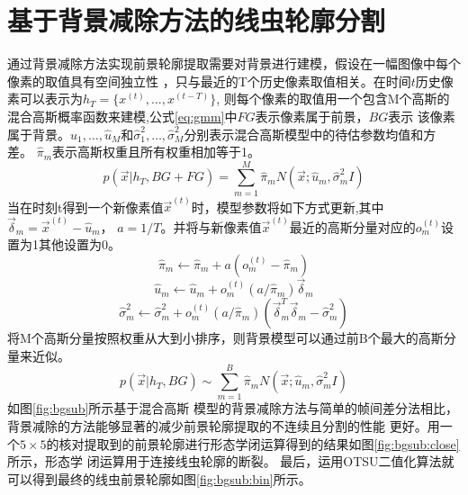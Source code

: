 \section{基于背景减除方法的线虫轮廓分割}
	通过背景减除方法实现前景轮廓提取需要对背景进行建模，假设在一幅图像中每个像素的取值具有空间独立性
	，只与最近的T个历史像素取值相关。在时间$t$历史像素可以表示为$h_T=\{x^{(t)},\dots,x^{(t-T)}\}$,
	则每个像素的取值用一个包含M个高斯的混合高斯概率函数来建模,公式\ref{eq:gmm}中$FG$表示像素属于前景，$BG$表示
	该像素属于背景。$\hat{u}_1,\dots,\hat{u}_M$和$\hat{\sigma}_1^2,\dots,\hat{\sigma}_M^2$分别表示混合高斯模型中的待估参数均值和方差。
	$\hat{\pi}_m$表示高斯权重且所有权重相加等于1。
	\begin{equation}
		p(\vec{x}|h_T,BG+FG)= \sum_{m=1}^{M} \hat{\pi}_{m}N(\vec{x};\hat{u}_m,\hat{\sigma}_m^2I)\label{eq:gmm}
	\end{equation}
	当在时刻t得到一个新像素值$\vec{x}^{(t)}$时，模型参数将如下方式更新,其中$\vec{\delta}_m=\vec{x}^{(t)}-\hat{u}_m$，
	$a=1/T$。并将与新像素值$\vec{x}^{(t)}$最近的高斯分量对应的$o_m^{(t)}$设置为1其他设置为0。
	\begin{equation}
		\hat{\pi}_m \leftarrow \hat{\pi}_m +a(o_m^{(t)}-\hat{\pi}_m) \label{eq:updata}
	\end{equation}
	\begin{equation}
		\hat{u}_m \leftarrow \hat{u}_m +o_m^{(t)}(a/\hat{\pi}_m)\vec{\delta}_m \label{eq:updata1}
	\end{equation}
	\begin{equation}
		\hat{\sigma}_m^2 \leftarrow \hat{\sigma}_m^2 +o_m^{(t)}(a/\hat{\pi}_m)(\vec{\delta}_m^T\vec{\delta}_m-\hat{\sigma}_m^2) \label{eq:updata2}
	\end{equation}
	将M个高斯分量按照权重从大到小排序，则背景模型可以通过前B个最大的高斯分量来近似。
	\begin{equation}
		p(\vec{x}|h_T,BG) \sim \sum_{m=1}^{B} \hat{\pi}_{m}N(\vec{x};\hat{u}_m,\hat{\sigma}_m^2I)\label{eq:bg}
	\end{equation}
	如图\ref{fig:bgsub}所示基于混合高斯
	模型的背景减除方法与简单的帧间差分法相比，背景减除的方法能够显著的减少前景轮廓提取的不连续且分割的性能
	更好。用一个$5\times5$的核对提取到的前景轮廓进行形态学闭运算得到的结果如图\ref{fig:bgsub:close}所示，形态学
	闭运算用于连接线虫轮廓的断裂。
	最后，运用OTSU二值化算法就可以得到最终的线虫前景轮廓如图\ref{fig:bgsub:bin}所示。

